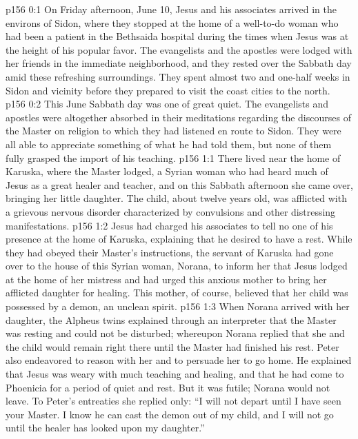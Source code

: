 \author{Midwayer Commission}
\vs p156 0:1 On Friday afternoon, June 10, Jesus and his associates arrived in the environs of Sidon, where they stopped at the home of a well\hyp{}to\hyp{}do woman who had been a patient in the Bethsaida hospital during the times when Jesus was at the height of his popular favor. The evangelists and the apostles were lodged with her friends in the immediate neighborhood, and they rested over the Sabbath day amid these refreshing surroundings. They spent almost two and one\hyp{}half weeks in Sidon and vicinity before they prepared to visit the coast cities to the north.
\vs p156 0:2 This June Sabbath day was one of great quiet. The evangelists and apostles were altogether absorbed in their meditations regarding the discourses of the Master on religion to which they had listened en route to Sidon. They were all able to appreciate something of what he had told them, but none of them fully grasped the import of his teaching.\plusone
{}
\vs p156 1:1 There lived near the home of Karuska, where the Master lodged, a Syrian woman who had heard much of Jesus as a great healer and teacher, and on this Sabbath afternoon she came over, bringing her little daughter. The child, about twelve years old, was afflicted with a grievous nervous disorder characterized by convulsions and other distressing manifestations.
\vs p156 1:2 Jesus had charged his associates to tell no one of his presence at the home of Karuska, explaining that he desired to have a rest. While they had obeyed their Master’s instructions, the servant of Karuska had gone over to the house of this Syrian woman, Norana, to inform her that Jesus lodged at the home of her mistress and had urged this anxious mother to bring her afflicted daughter for healing. This mother, of course, believed that her child was possessed by a demon, an unclean spirit.
\vs p156 1:3 When Norana arrived with her daughter, the Alpheus twins explained through an interpreter that the Master was resting and could not be disturbed; whereupon Norana replied that she and the child would remain right there until the Master had finished his rest. Peter also endeavored to reason with her and to persuade her to go home. He explained that Jesus was weary with much teaching and healing, and that he had come to Phoenicia for a period of quiet and rest. But it was futile; Norana would not leave. To Peter’s entreaties she replied only: “I will not depart until I have seen your Master. I know he can cast the demon out of my child, and I will not go until the healer has looked upon my daughter.”
